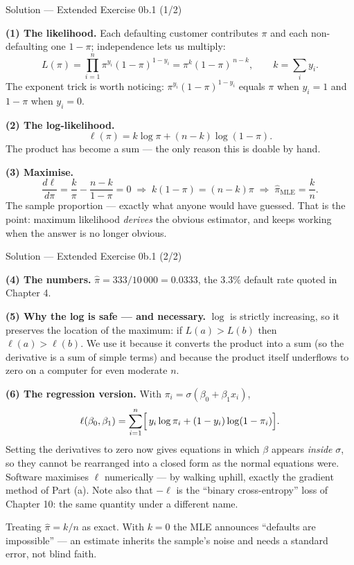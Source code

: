 \documentclass[aspectratio=169,11pt]{beamer}
\begin{document}
\begin{frame}{Solution --- Extended Exercise 0b.1 (1/2)}
  \begin{solutionbox}
    \textbf{(1) The likelihood.} Each defaulting customer contributes $\pi$ and
    each non-defaulting one $1-\pi$; independence lets us multiply:
    \[
      L(\pi) = \prod_{i=1}^{n} \pi^{y_i}(1-\pi)^{1-y_i}
             = \pi^{k}(1-\pi)^{\,n-k},
      \qquad k = \sum_i y_i .
    \]
    The exponent trick is worth noticing: $\pi^{y_i}(1-\pi)^{1-y_i}$ equals
    $\pi$ when $y_i = 1$ and $1-\pi$ when $y_i = 0$.

    \textbf{(2) The log-likelihood.}
    \[
      \ell(\pi) = k\log \pi + (n-k)\log(1-\pi).
    \]
    The product has become a sum --- the only reason this is doable by hand.

    \textbf{(3) Maximise.}
    \[
      \frac{d\ell}{d\pi} = \frac{k}{\pi} - \frac{n-k}{1-\pi} = 0
      \;\Longrightarrow\;
      k(1-\pi) = (n-k)\pi
      \;\Longrightarrow\;
      \hat\pi_{\mathrm{MLE}} = \frac{k}{n}.
    \]
    The sample proportion --- exactly what anyone would have guessed. That is
    the point: maximum likelihood \emph{derives} the obvious estimator, and
    keeps working when the answer is no longer obvious.
  \end{solutionbox}
\end{frame}

\begin{frame}{Solution --- Extended Exercise 0b.1 (2/2)}
  \begin{solutionbox}
    \scriptsize
    \textbf{(4) The numbers.} $\hat\pi = 333/10\,000 = \mathbf{0.0333}$, the
    $3.3\%$ default rate quoted in Chapter 4.

    \textbf{(5) Why the log is safe --- and necessary.} $\log$ is strictly
    increasing, so it preserves the location of the maximum: if
    $L(a) > L(b)$ then $\ell(a) > \ell(b)$. We use it because it converts the
    product into a sum (so the derivative is a sum of simple terms) and because
    the product itself underflows to zero on a computer for even moderate $n$.

    \textbf{(6) The regression version.} With
    $\pi_i = \sigma(\beta_0 + \beta_1 x_i)$,
    \[
      \ell(\beta_0,\beta_1) = \sum_{i=1}^{n}
        \Bigl[\,y_i \log \pi_i + (1-y_i)\log(1-\pi_i)\Bigr].
    \]
    Setting the derivatives to zero now gives equations in which
    $\beta$ appears \emph{inside} $\sigma$, so they cannot be rearranged into
    a closed form as the normal equations were. Software maximises $\ell$
    numerically --- by walking uphill, exactly the gradient method of
    Part (a). Note also that $-\ell$ is the ``binary cross-entropy'' loss of
    Chapter 10: the same quantity under a different name.
  \end{solutionbox}
  \begin{mistake}
    Treating $\hat\pi = k/n$ as exact. With $k=0$
    the MLE announces ``defaults are impossible'' --- an estimate inherits the
    sample's noise and needs a standard error, not blind faith.
  \end{mistake}
\end{frame}
\end{document}
